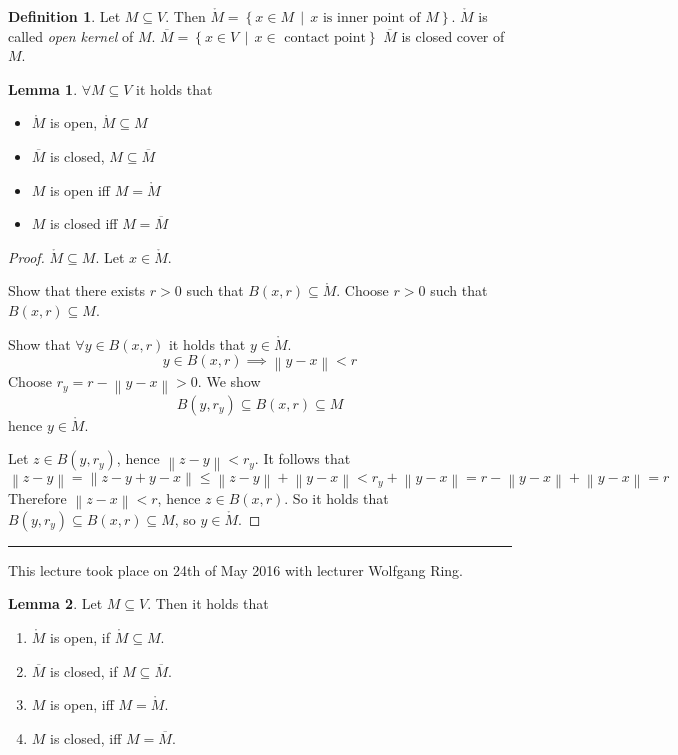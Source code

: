 \documentclass[a4paper,landscape,twocolumn]{article}
\theoremstyle{definition}
\newtheorem{defi}{Definition}
\newtheorem{lemma}{Lemma}
\newcommand\setdef[2]{\left\{#1\,\middle|\,#2\right\}}
\newcommand\meta[3]{\hrule{} This #1 took place on #2 with lecturer #3.\par}
\newcommand\norm[1]{\left\|#1\right\|}
\begin{document}
\begin{defi}
  Let $M \subseteq V$. Then $\mathring{M} = \setdef{x \in M}{x \text{ is inner point of } M}$.
  $\mathring{M}$ is called \emph{open kernel} of $M$.
  $\overline{M} = \setdef{x \in V}{x \in \text{ contact point}}$
  $\overline{M}$ is closed cover of $M$.
\end{defi}

\begin{lemma}
  $\forall M \subseteq V$ it holds that
  \begin{itemize}
  \item $\mathring{M}$ is open, $\mathring{M} \subseteq M$
  \item $\overline{M}$ is closed, $M \subseteq \overline{M}$
  \item $M$ is open iff $M = \mathring{M}$
  \item $M$ is closed iff $M = \overline{M}$
  \end{itemize}
\end{lemma}
\begin{proof}
  $\mathring{M} \subseteq M$. Let $x \in \mathring{M}$.

  Show that there exists $r > 0$ such that $B(x,r) \subseteq \mathring{M}$.
  Choose $r > 0$ such that $B(x,r) \subseteq M$.

  Show that $\forall y \in B(x,r)$ it holds that $y \in \mathring{M}$.
  \[ y \in B(x,r) \implies \norm{y - x} < r \]
  Choose $r_y = r - \norm{y-x} > 0$. We show
  \[ B(y,r_y) \subseteq B(x,r) \subseteq M \]
  hence $y \in \mathring{M}$.

  Let $z \in B(y,r_y)$, hence $\norm{z-y} < r_y$.
  It follows that
  \[ \norm{z-y} = \norm{z-y+y-x} \leq \norm{z-y} + \norm{y-x} < r_y + \norm{y-x} = r - \norm{y-x} + \norm{y-x} = r \]
  Therefore $\norm{z-x} < r$, hence $z \in B(x,r)$.
  So it holds that $B(y,r_y) \subseteq B(x,r) \subseteq M$, so $y \in \mathring{M}$.
\end{proof}

\meta{lecture}{24th of May 2016}{Wolfgang Ring}

\begin{lemma}
  Let $M \subseteq V$. Then it holds that
  \begin{enumerate}
    \item $\mathring{M}$ is open, if $\mathring{M} \subseteq M$.
    \item $\overline{M}$ is closed, if $M \subseteq \overline{M}$.
    \item $M$ is open, iff $M = \mathring{M}$.
    \item $M$ is closed, iff $M = \overline{M}$.
  \end{enumerate}
\end{lemma}
\end{document}
